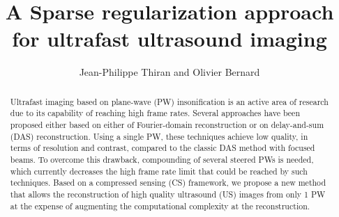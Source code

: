 \documentclass[conference]{IEEEtran}
\begin{document}
%
\title{A Sparse regularization approach for ultrafast ultrasound imaging}

\author{
Jean-Philippe Thiran and
Olivier Bernard
}
\maketitle

\begin{abstract}
Ultrafast imaging based on plane-wave (PW) insonification is an active area of research due to its capability of reaching high frame rates. Several approaches have been proposed either based on either of Fourier-domain reconstruction or on delay-and-sum (DAS) reconstruction. Using a single PW, these techniques achieve low quality, in terms of resolution and contrast, compared to the classic DAS method with focused beams. To overcome this drawback, compounding of several steered PWs is needed, which currently decreases the high frame rate limit that could be reached by such techniques. Based on a compressed sensing (CS) framework, we propose a new method that allows the reconstruction of high quality ultrasound (US) images from only 1 PW at the expense of augmenting the computational complexity at the reconstruction.
\end{abstract}
\end{document}
